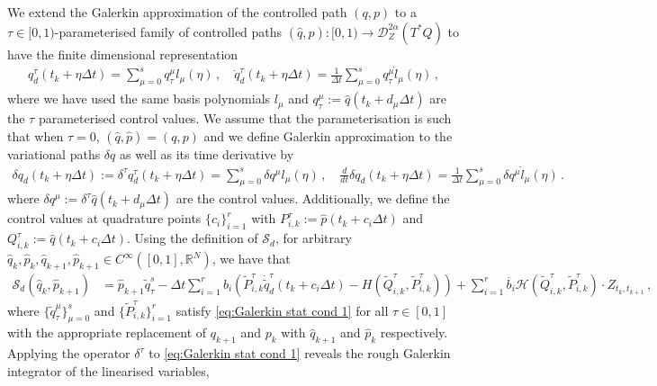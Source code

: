 \documentclass[11pt, oneside]{article}
\numberwithin{equation}{section}
\theoremstyle{definition}
\newcommand{\ob}[1]{\overline{#1}}
\newcommand{\wt}[1]{\widetilde{#1}}
\newcommand{\wh}[1]{\widehat{#1}}
\newcommand{\mc}[1]{\mathcal{#1}}
\newcommand{\mcal}[1]{\mc{#1}}
\begin{document}
We extend the Galerkin approximation of the controlled path $(q, p)$ to a $\tau\in [0,1)$-parameterised family of controlled paths $(\wh{q}, \wh{p}) : [0,1) \rightarrow \mcal{D}^{2\alpha}_Z(T^*Q)$ to have the finite dimensional representation
\begin{align}
    q^\tau_d(t_k+\eta\Delta t) = \sum_{\mu=0}^s q^\mu_\tau l_\mu(\eta)\,,\quad \dot{q}^\tau_d(t_k+\eta\Delta t) = \frac{1}{\Delta t}\sum_{\mu=0}^s q^\mu_\tau \dot{l}_\mu(\eta)\,,
\end{align}
where we have used the same basis polynomials $l_\mu$ and $q^\mu_\tau := \wh{q}(t_k + d_\mu \Delta t)$ are the $\tau$ parameterised control values. We assume that the parameterisation is such that when $\tau = 0$, $(\wh{q}, \wh{p}) = (q,p)$ and we define Galerkin approximation to the variational paths $\delta q$ as well as its time derivative by
\begin{align}
     \delta q_d(t_k + \eta\Delta t) := \delta^\tau q^\tau_d(t_k + \eta\Delta t) = \sum_{\mu=0}^s\delta q^\mu l_\mu(\eta)\,, \quad \frac{d}{dt}\delta q_d(t_k + \eta \Delta t) = \frac{1}{\Delta t}\sum_{\mu=0}^s \delta q^\mu \dot{l}_\mu(\eta)\,.
\end{align}
where $\delta q^\mu := \delta^\tau \wh{q}(t_k + d_\mu\Delta t)$ are the control values. Additionally, we define the control values at quadrature points $\{c_i\}_{i=1}^r$ with $P^\tau_{i,k} := \wh{p}(t_k + c_i\Delta t)$ and $Q^\tau_{i,k} := \wh{q}(t_k + c_i\Delta t)$. Using the definition of $\mcal{S}_d$, for arbitrary $\wh{q}_k, \wh{p}_k, \wh{q}_{k+1},\wh{p}_{k+1} \in C^\infty([0,1], \mathbb{R}^N)$, we have that
\begin{align}
    \mcal{S}_d(\wh{q}_k, \wh{p}_{k+1})&= \wh{p}_{k+1}\wt{q}^s_\tau - \Delta t \sum_{i=1}^r b_i\left( \wt{P}^\tau_{i,k} \dot{\wt{q}}^\tau_d(t_k + c_i \Delta t) - H(\wt{Q}^\tau_{i,k}, \wt{P}^\tau_{i,k})\right) + \sum_{i=1}^r \ob{b}_i\mcal{H}(\wt{Q}^\tau_{i,k}, \wt{P}^\tau_{i,k})\cdot Z_{t_k, t_{k+1}}\,,
\end{align}
where $\{\wt{q}^\mu_\tau\}_{\mu=0}^s$ and $\{\wt{P}^\tau_{i,k}\}_{i=1}^r$ satisfy \eqref{eq:Galerkin stat cond 1} for all $\tau \in [0,1]$ with the appropriate replacement of $q_{k+1}$ and $p_k$ with $\wh{q}_{k+1}$ and $\wh{p}_k$ respectively. Applying the operator $\delta^\tau$ to \eqref{eq:Galerkin stat cond 1} reveals the rough Galerkin integrator of the linearised variables,
\end{document}
